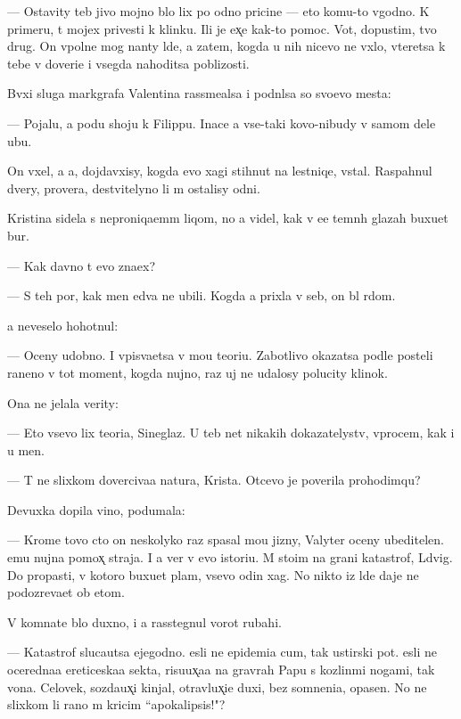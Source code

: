 \documentclass[10pt]{book}
\begin{document}
— Ostavity teb{\ia} jivo{\y} mojno b{\yi}lo lix po odno{\y} pricine — eto komu-to v{\yi}godno. K primeru, t{\yi} mojex privesti k klinku. Ili je {\y}ex̨e kak-to pomoc. Vot, dopustim, tvo{\y} drug. On vpolne mog nan{\ia}ty l{\iu}de{\y}, a zatem, kogda u nih nicevo ne v{\yi}xlo, vteretsa k tebe v doveri{\y}e i vsegda nahoditsa poblizosti.

B{\yi}vxi{\y} sluga markgrafa Valentina rassme{\y}alsa i podn{\ia}lsa so svo{\y}evo mesta:

— Pojalu{\y}, {\y}a po{\y}du shoju k Filippu. Inace {\y}a vse-taki kovo-nibudy v samom dele ub{\y}u.

On v{\yi}xel, a {\y}a, dojdavxisy, kogda {\y}evo xagi stihnut na lestniqe, vstal. Raspahnul dvery, prover{\ia}{\y}a, de{\y}stvitelyno li m{\yi} ostalisy odni.

Kristina sidela s neproniqa{\y}em{\yi}m liqom, no {\y}a videl, kak v {\y}e{\y}e temn{\yi}h glazah buxu{\y}et bur{\ia}.

— Kak davno t{\yi} {\y}evo zna{\y}ex?

— S teh por, kak men{\ia} {\y}edva ne ubili. Kogda {\y}a prixla v seb{\ia}, on b{\yi}l r{\ia}dom.

{\Y}a neveselo hohotnul:

— Oceny udobno. I vpis{\yi}va{\y}etsa v mo{\y}u teori{\y}u. Zabotlivo okazatsa podle posteli raneno{\y} v tot moment, kogda nujno, raz uj ne udalosy polucity klinok.

Ona ne jelala verity:

— Eto vsevo lix teori{\y}a, Sineglaz{\yi}{\y}. U teb{\ia} net nikakih dokazatelystv, vprocem, kak i u men{\ia}.

— T{\yi} ne slixkom doverciva{\y}a natura, Krista. Otcevo je poverila prohodimqu?

Devuxka dopila vino, podumala:

— Krome tovo cto on neskolyko raz spasal mo{\y}u jizny, Valyter oceny ubeditelen. {\Y}emu nujna pomox̨ straja. I {\y}a ver{\iu} v {\y}evo istori{\y}u. M{\yi} sto{\y}im na grani katastrof{\yi}, L{\iu}dvig. Do propasti, v kotoro{\y} buxu{\y}et plam{\ia}, vsevo odin xag. No nikto iz l{\iu}de{\y} daje ne podozreva{\y}et ob etom.

V komnate b{\yi}lo duxno, i {\y}a rasstegnul vorot rubahi.

— Katastrof{\yi} sluca{\y}utsa {\y}ejegodno. {\Y}esli ne epidemi{\y}a cum{\yi}, tak {\y}ustirski{\y} pot. {\Y}esli ne oceredna{\y}a {\y}ereticeska{\y}a sekta, risu{\y}ux̨a{\y}a na grav{\iu}rah Papu s kozlin{\yi}mi nogami, tak vo{\y}na. Celovek, sozda{\y}ux̨i{\y} kinjal{\yi}, otravl{\ia}{\y}ux̨i{\y}e duxi, bez somneni{\y}a, opasen. No ne slixkom li rano m{\yi} kricim ``apokalipsis!"?
\end{document}
